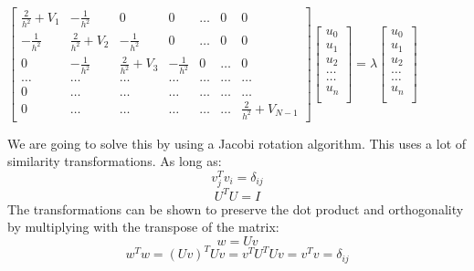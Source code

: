 \documentclass[10pt,a4paper]{article}
\begin{document}
\begin{center}


$
 \begin{bmatrix}
 \frac{2}{h^2}+V_1 & -\frac{1}{h^2} & 0   & 0    & \dots  &0     & 0 \\
 -\frac{1}{h^2} & \frac{2}{h^2}+V_2 & -\frac{1}{h^2} & 0    & \dots  &0     &0 \\
  0   & -\frac{1}{h^2} & \frac{2}{h^2}+V_3 & -\frac{1}{h^2}  &0       &\dots & 0\\
  \dots  & \dots & \dots & \dots  &\dots      &\dots & \dots\\
  0   & \dots & \dots & \dots  &\dots  &\dots & \dots\\
 0   & \dots & \dots & \dots  &\dots       & \dots & \frac{2}{h^2}+V_{N-1}
             \end{bmatrix}
             \begin{bmatrix}
             u_0\\
             u_1\\
             u_2\\
             \dots\\
             \dots\\
             u_n\\
             \end{bmatrix} =\lambda
             \begin{bmatrix}
              u_0\\
             u_1\\
             u_2\\
             \dots\\
             \dots\\
             u_n\\
             \end{bmatrix}
$
\end{center}
We are going to solve this by using a Jacobi rotation algorithm. This uses a lot of similarity transformations. As long as:
$$v_j^Tv_i=\delta_{i j}$$
$$U^TU=I$$
The transformations can be shown to preserve the dot product and orthogonality by multiplying with the transpose of the matrix:
$$w=Uv$$
$$w^Tw=(Uv)^TUv=v^TU^TUv=v^Tv=\delta_{i j}$$
\end{document}
